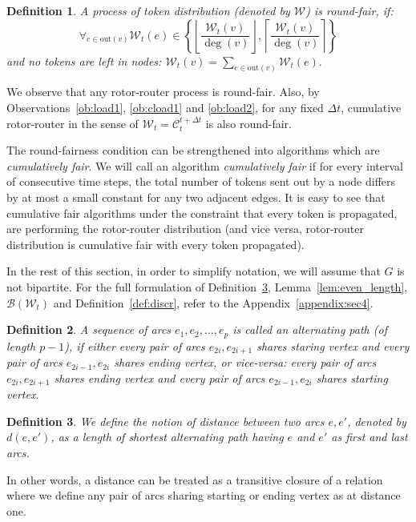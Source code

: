 \documentclass{article}[11pt,letter]
\newtheorem{definition}{Definition}[section]
\newcommand{\outedg}{\mathrm{out}}
\newcommand{\wload}{\mathcal{W}}
\newcommand{\cload}{\mathcal{C}}
\newcommand{\dt}{\Delta t}
\begin{document}
\begin{definition}
A process of token distribution (denoted by $\mathcal{W}$) is \emph{round-fair},
if:
\begin{equation}
\label{eq:roundfair}
\forall_{e\in \outedg(v)} \wload_t(e) \in \left\{\left\lfloor \frac{\wload_t(v)}{\deg(v)} \right\rfloor,\left\lceil\frac{\wload_t(v)}{\deg(v)}\right\rceil \right\}
\end{equation}
and no tokens are left in nodes:
$ \wload_t(v) = \sum_{e \in \outedg(v)} \wload_t(e).$
\end{definition}
We observe that any rotor-router process is round-fair. Also, by Observations~\ref{ob:load1}, \ref{ob:cload1} and \ref{ob:load2}, for any fixed $\dt$, cumulative rotor-router in the sense of $\wload_t = \cload_t^{t+\dt}$ is also round-fair.

The round-fairness condition can be strengthened into algorithms which are \emph{cumulatively fair}. We will call an algorithm \emph{cumulatively fair} if for every interval of consecutive time steps, the total number of tokens sent out by a node differs by at most a small constant for any two adjacent edges.
It is easy to see that cumulative fair algorithms under the constraint that every token is propagated, are performing the rotor-router distribution (and vice versa, rotor-router distribution is cumulative fair with every token propagated).


In the rest of this section, in order to simplify notation, we will assume that $G$ is not bipartite. For the full formulation of Definition~\ref{def:distance}, Lemma~\ref{lem:even_length}, $\mathcal{B}(\mathcal{W}_t)$ and Definition~\ref{def:discr}, refer to the Appendix~\ref{appendix:sec4}.

\begin{definition}
A sequence of arcs $e_1,e_2,\ldots,e_p$ is called an \emph{alternating path} (of length $p-1$), if either every pair of arcs $e_{2i},e_{2i+1}$ shares staring vertex and every pair of arcs $e_{2i-1},e_{2i}$ shares ending vertex, or vice-versa: every pair of arcs $e_{2i},e_{2i+1}$ shares ending vertex and every pair of arcs $e_{2i-1},e_{2i}$ shares starting vertex.
\end{definition}

\begin{definition}
\label{def:distance}
We define the notion of \emph{distance} between two arcs $e,e'$, denoted by $d(e,e')$, as a length of shortest alternating path having $e$ and $e'$ as first and last arcs.
\end{definition}
In other words, a distance can be treated as a transitive closure of a relation where we define any pair of arcs sharing starting or ending vertex as at distance one.
\end{document}
